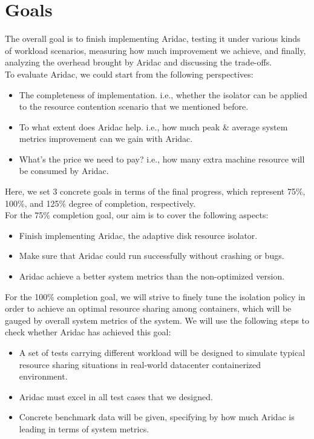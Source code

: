 \documentclass[10pt, conference,compsoc]{IEEEtran}
\begin{document}
\section{Goals}
The overall goal is to finish implementing Aridac, testing it under various kinds of workload scenarios, measuring how much improvement we achieve, and finally, analyzing the overhead brought by Aridac and discussing the trade-offs.\\

To evaluate Aridac, we could start from the following perspectives:
\begin{itemize}
  \item The completeness of implementation. i.e., whether the isolator can be applied to the resource contention scenario that we mentioned before.
  \item To what extent does Aridac help. i.e., how much peak \& average system metrics improvement can we gain with Aridac.
  \item What's the price we need to pay? i.e., how many extra machine resource will be consumed by Aridac.
\end{itemize}


Here, we set 3 concrete goals in terms of the final progress, which represent 75\%, 100\%, and 125\% degree of completion, respectively.\\

For the 75\% completion goal, our aim is to cover the following aspects:
\begin{itemize}
  \item Finish implementing Aridac, the adaptive disk resource isolator.
  \item Make sure that Aridac could run successfully without crashing or bugs.
  \item Aridac achieve a better system metrics than the non-optimized version.
\end{itemize}

For the 100\% completion goal, we will strive to finely tune the isolation policy in order to achieve an optimal resource sharing among containers, which will be gauged by overall system metrics of the system. We will use the following steps to check whether Aridac has achieved this goal:
\begin{itemize}
  \item A set of tests carrying different workload will be designed to simulate typical resource sharing situations in real-world datacenter containerized environment.
  \item Aridac must excel in all test cases that we designed.
  \item Concrete benchmark data will be given, specifying by how much Aridac is leading in terms of system metrics.
\end{itemize}
\end{document}
